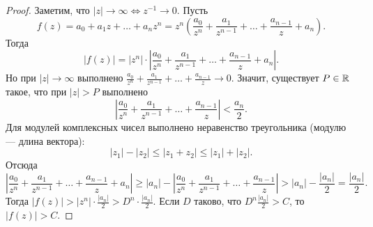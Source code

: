 \begin{proof}
    Заметим, что $|z| \rightarrow \infty \Leftrightarrow z^{-1} \rightarrow 0$. Пусть
    $$
    f(z) = a_0 + a_1z + \ldots + a_nz^n = z^n\left(\frac{a_0}{z^n} + \frac{a_1}{z^{n - 1}} + \ldots + \frac{a_{n - 1}}{z} + a_n\right).
    $$
    Тогда
    $$
    |f(z)| = |z^n| \cdot \left|\frac{a_0}{z^n} + \frac{a_1}{z^{n - 1}} + \ldots + \frac{a_{n - 1}}{z} + a_n\right|.
    $$
    Но при $|z| \rightarrow \infty$ выполнено $\displaystyle\frac{a_0}{z^n} + \frac{a_1}{z^{n - 1}} + \ldots + \frac{a_{n - 1}}{z} \rightarrow 0$. Значит, существует $P \in \mathbb{R}$ такое, что при $|z| > P$ выполнено
    $$
    \left|\frac{a_0}{z^n} + \frac{a_1}{z^{n - 1}} + \ldots + \frac{a_{n - 1}}{z}\right| < \frac{a_n}{2}.
    $$
    Для модулей комплексных чисел выполнено неравенство треугольника (модулю --- длина вектора):
    $$
    |z_1| - |z_2| \leqslant |z_1 + z_2| \leqslant |z_1| + |z_2|.
    $$
    Отсюда
    $$
    \left|\frac{a_0}{z^n} + \frac{a_1}{z^{n - 1}} + \ldots + \frac{a_{n - 1}}{z} + a_n\right| \geqslant |a_n| - \left|\frac{a_0}{z^n} + \frac{a_1}{z^{n - 1}} + \ldots + \frac{a_{n - 1}}{z}\right| > |a_n| - \frac{|a_n|}{2} = \frac{|a_n|}{2}.
    $$
    Тогда $|f(z)| > |z^n|\cdot\frac{|a_n|}{2} > D^n\cdot\frac{|a_n|}{2}$. Если $D$ таково, что $D^n\frac{|a_n|}{2} > C$, то $|f(z)| > C$.
\end{proof}



